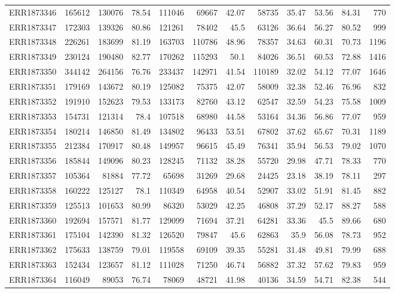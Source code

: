 \documentclass[12pt, oneside]{report}
\begin{document}
\begin{longtable}{@{}p{3.2cm}rrrrrrrrrrr@{}}
ERR1873346 & 165612 & 130076 & 78.54 & 111046 & 69667 & 42.07 & 58735 & 35.47 & 53.56 & 84.31 & 770 \\
ERR1873347 & 172303 & 139326 & 80.86 & 121261 & 78402 & 45.5 & 63126 & 36.64 & 56.27 & 80.52 & 999 \\
ERR1873348 & 226261 & 183699 & 81.19 & 163703 & 110786 & 48.96 & 78357 & 34.63 & 60.31 & 70.73 & 1196 \\
ERR1873349 & 230124 & 190480 & 82.77 & 170262 & 115293 & 50.1 & 84026 & 36.51 & 60.53 & 72.88 & 1416 \\
ERR1873350 & 344142 & 264156 & 76.76 & 233437 & 142971 & 41.54 & 110189 & 32.02 & 54.12 & 77.07 & 1646 \\
ERR1873351 & 179169 & 143672 & 80.19 & 125082 & 75375 & 42.07 & 58009 & 32.38 & 52.46 & 76.96 & 832 \\
ERR1873352 & 191910 & 152623 & 79.53 & 133173 & 82760 & 43.12 & 62547 & 32.59 & 54.23 & 75.58 & 1009 \\
ERR1873353 & 154731 & 121314 & 78.4 & 107518 & 68980 & 44.58 & 53164 & 34.36 & 56.86 & 77.07 & 959 \\
ERR1873354 & 180214 & 146850 & 81.49 & 134802 & 96433 & 53.51 & 67802 & 37.62 & 65.67 & 70.31 & 1189 \\
ERR1873355 & 212384 & 170917 & 80.48 & 149957 & 96615 & 45.49 & 76341 & 35.94 & 56.53 & 79.02 & 1070 \\
ERR1873356 & 185844 & 149096 & 80.23 & 128245 & 71132 & 38.28 & 55720 & 29.98 & 47.71 & 78.33 & 770 \\
ERR1873357 & 105364 & 81884 & 77.72 & 65698 & 31269 & 29.68 & 24425 & 23.18 & 38.19 & 78.11 & 297 \\
ERR1873358 & 160222 & 125127 & 78.1 & 110349 & 64958 & 40.54 & 52907 & 33.02 & 51.91 & 81.45 & 882 \\
ERR1873359 & 125513 & 101653 & 80.99 & 86320 & 53029 & 42.25 & 46808 & 37.29 & 52.17 & 88.27 & 588 \\
ERR1873360 & 192694 & 157571 & 81.77 & 129099 & 71694 & 37.21 & 64281 & 33.36 & 45.5 & 89.66 & 680 \\
ERR1873361 & 175104 & 142390 & 81.32 & 126520 & 79847 & 45.6 & 62863 & 35.9 & 56.08 & 78.73 & 952 \\
ERR1873362 & 175633 & 138759 & 79.01 & 119558 & 69109 & 39.35 & 55281 & 31.48 & 49.81 & 79.99 & 688 \\
ERR1873363 & 152434 & 123657 & 81.12 & 111028 & 71250 & 46.74 & 56882 & 37.32 & 57.62 & 79.83 & 959 \\
ERR1873364 & 116049 & 89053 & 76.74 & 78069 & 48721 & 41.98 & 40136 & 34.59 & 54.71 & 82.38 & 544 \\

\end{longtable}
\end{document}
